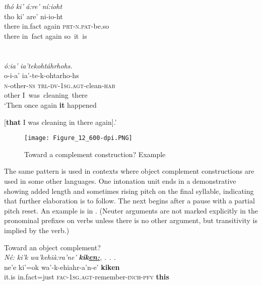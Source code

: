 \documentclass[output=paper]{langscibook}
\begin{document}
    \gllll \textit{thó}    \textit{ki’}      \textit{á:re’}  \textit{ní:ioht} \\
    tho    ki’      are’    ni-io-ht        \\
    there  in.fact    again  \textsc{prt-n.pat}{}-be.so  \\
    there  {in~fact}    again  {so~it~is}\\~\\~\\

\gllll         \textit{ó:ia’}        \textit{ia’tekohtáhrhohs.}\\
          o-i-a’        ia’-te-k-ohtarho-hs\\
          \textsc{n-}other-\textsc{ns}    \textsc{trl-dv-1sg.agt}{}-clean-\textsc{hab}\\
          other        {I~was~cleaning~there}\\
\glt    ‘Then once again \textbf{it} happened 

      [\textbf{that} I was cleaning in there again].’


\z

\begin{figure}
\texttt{[image: Figure\_12\_600-dpi.PNG]}
\caption{Toward a complement construction? Example }
\label{fig:mithun:12}
\end{figure}

The same pattern is used in contexts where object complement constructions are used in some other languages. One intonation unit ends in a demonstrative showing added length and sometimes rising pitch on the final syllable, indicating that further elaboration is to follow. The next begins after a pause with a partial pitch reset. An example is in . (Neuter arguments are not marked explicitly in the pronominal prefixes on verbs unless there is no other argument, but transitivity is implied by the verb.)

\ea%
    \label{ex:mithun:23}
    Toward an object complement?\\
   \glll \textit{Né:}    \textit{ki’k}          \textit{wa’kehià:ra’ne’} \textbf{\textit{kik\uline{en:}}}\textit{,}  \textit{. . .}\\
    ne’e    ki’=ok        wa’-k-ehiahr-a’n-e’               \textbf{kiken}\\
    it.is    in.fact=just  \textsc{fac-1sg.agt}{}-remember-\textsc{inch-pfv} \textbf{this}\\~\\~\\
\end{document}
